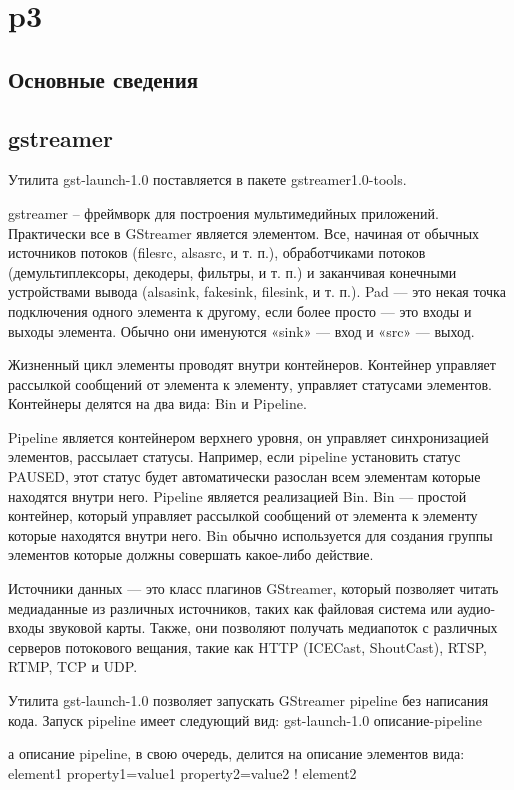 
\section{p3}


\subsection{Основные сведения}
\subsection{gstreamer}
Утилита gst-launch-1.0 поставляется в пакете gstreamer1.0-tools.

gstreamer -- фреймворк для построения мультимедийных приложений. Практически все в GStreamer является элементом. Все, начиная от обычных источников потоков (filesrc, alsasrc, и т. п.), обработчиками потоков (демультиплексоры, декодеры, фильтры, и т. п.) и заканчивая конечными устройствами вывода (alsasink, fakesink, filesink, и т. п.).
Pad — это некая точка подключения одного элемента к другому, если более просто — это входы и выходы элемента. Обычно они именуются «sink» — вход и «src» — выход.

Жизненный цикл элементы проводят внутри контейнеров. Контейнер управляет рассылкой сообщений от элемента к элементу, управляет статусами элементов. Контейнеры делятся на два вида: Bin и Pipeline.

Pipeline является контейнером верхнего уровня, он управляет синхронизацией элементов, рассылает статусы. Например, если pipeline установить статус PAUSED, этот статус будет автоматически разослан всем элементам которые находятся внутри него. Pipeline является реализацией Bin.
Bin — простой контейнер, который управляет рассылкой сообщений от элемента к элементу которые находятся внутри него. Bin обычно используется для создания группы элементов которые должны совершать какое-либо действие. 

Источники данных — это класс плагинов GStreamer, который позволяет читать медиаданные из различных источников, таких как файловая система или аудио-входы звуковой карты. Также, они позволяют получать медиапоток с различных серверов потокового вещания, такие как HTTP (ICECast, ShoutCast), RTSP, RTMP, TCP и UDP. 

Утилита gst-launch-1.0 позволяет запускать GStreamer pipeline без написания кода. Запуск pipeline имеет следующий вид:
gst-launch-1.0 описание-pipeline

а описание pipeline, в свою очередь, делится на описание элементов вида:
element1 property1=value1 property2=value2 ! element2 

